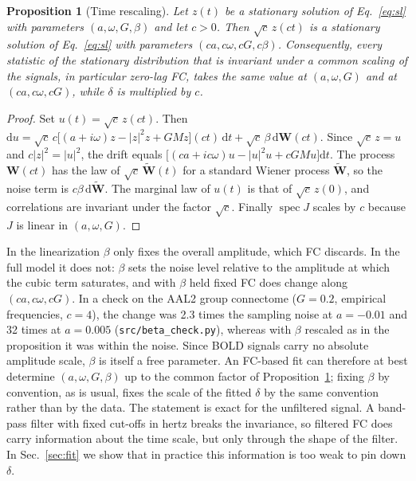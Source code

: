 \documentclass[aip,cha,reprint,amsmath,amssymb]{revtex4-2}
\newtheorem{proposition}{Proposition}
\theoremstyle{remark}
\begin{document}
\begin{proposition}[Time rescaling]\label{prop:rescale}
Let $z(t)$ be a stationary solution of Eq.~\eqref{eq:sl} with parameters $(a,\omega,G,\beta)$ and let $c>0$. Then $\sqrt c\,z(ct)$ is a stationary solution of Eq.~\eqref{eq:sl} with parameters $(ca,c\omega,cG,c\beta)$. Consequently, every statistic of the stationary distribution that is invariant under a common scaling of the signals, in particular zero-lag FC, takes the same value at $(a,\omega,G)$ and at $(ca,c\omega,cG)$, while $\delta$ is multiplied by $c$.
\end{proposition}

\begin{proof}
Set $u(t)=\sqrt c\,z(ct)$. Then $\mathrm du=\sqrt c\,c\bigl[(a+i\omega)z-|z|^2z+GMz\bigr](ct)\,\mathrm dt+\sqrt c\,\beta\,\mathrm d\mathbf W(ct)$. Since $\sqrt c\,z=u$ and $c|z|^2=|u|^2$, the drift equals $\bigl[(ca+ic\omega)u-|u|^2u+cGMu\bigr]\mathrm dt$. The process $\mathbf W(ct)$ has the law of $\sqrt c\,\widetilde{\mathbf W}(t)$ for a standard Wiener process $\widetilde{\mathbf W}$, so the noise term is $c\beta\,\mathrm d\widetilde{\mathbf W}$. The marginal law of $u(t)$ is that of $\sqrt c\,z(0)$, and correlations are invariant under the factor $\sqrt c$. Finally $\operatorname{spec}J$ scales by $c$ because $J$ is linear in $(a,\omega,G)$.
\end{proof}

In the linearization $\beta$ only fixes the overall amplitude, which FC discards. In the full model it does not: $\beta$ sets the noise level relative to the amplitude at which the cubic term saturates, and with $\beta$ held fixed FC does change along $(ca,c\omega,cG)$. In a check on the AAL2 group connectome ($G=0.2$, empirical frequencies, $c=4$), the change was 2.3 times the sampling noise at $a=-0.01$ and 32 times at $a=0.005$ (\texttt{src/beta\_check.py}), whereas with $\beta$ rescaled as in the proposition it was within the noise. Since BOLD signals carry no absolute amplitude scale, $\beta$ is itself a free parameter. An FC-based fit can therefore at best determine $(a,\omega,G,\beta)$ up to the common factor of Proposition~\ref{prop:rescale}; fixing $\beta$ by convention, as is usual, fixes the scale of the fitted $\delta$ by the same convention rather than by the data. The statement is exact for the unfiltered signal. A band-pass filter with fixed cut-offs in hertz breaks the invariance, so filtered FC does carry information about the time scale, but only through the shape of the filter. In Sec.~\ref{sec:fit} we show that in practice this information is too weak to pin down $\delta$.
\end{document}
